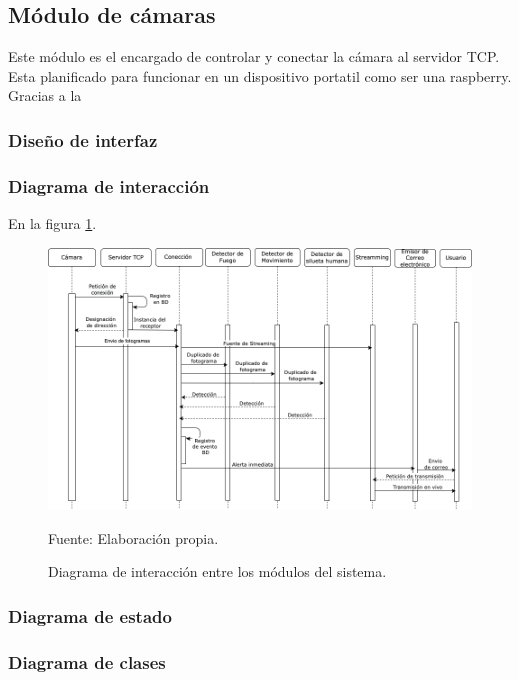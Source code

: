 \subsection{Módulo de cámaras}
Este módulo es el encargado de controlar y conectar la cámara al servidor TCP. Esta planificado para funcionar en un dispositivo portatil como ser una raspberry. Gracias a la
\subsubsection{Diseño de interfaz}

\subsubsection{Diagrama de interacción}

En la figura \ref{fig:diagrama_interaccion_general}.
\begin{figure}[H]
    \begin{center}
        \includegraphics[width=17cm]{img/capitulo_4/interaccion.png}
    \end{center}
    \begin{center}
        \caption{Diagrama de interacción entre los módulos del sistema.}
        Fuente: Elaboración propia.
        \label{fig:diagrama_interaccion_general}
    \end{center}
\end{figure}

\subsubsection{Diagrama de estado}

\subsubsection{Diagrama de clases}

